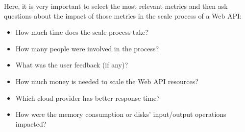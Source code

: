 \documentclass[10pt,article]{IEEEtran}
\begin{document}
Here, it is very important to select the most relevant metrics and then ask questions about the impact of those metrics in the scale process of a Web API:
\begin{itemize}
    \item
    How much time does the scale process take?
    \item
    How many people were involved in the process?
    \item
    What was the user feedback (if any)?
    \item
    How much money is needed to scale the Web API resources?
    \item
    Which cloud provider has better response time?
    \item
    How were the memory consumption or disks' input/output operations impacted? 
\end{itemize}






%
%

\end{document}
